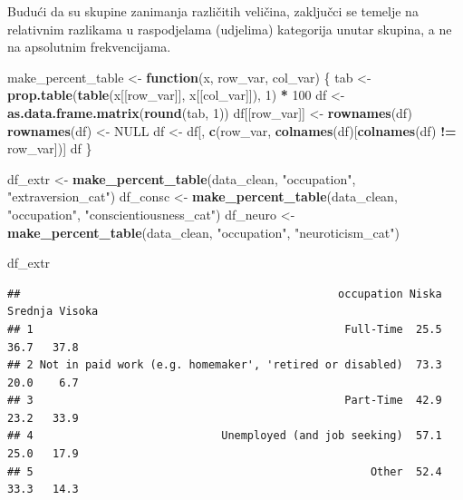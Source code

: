 \documentclass[
]{article}
\newenvironment{Shaded}{\begin{snugshade}}{\end{snugshade}}
\newcommand{\ConstantTok}[1]{\textcolor[rgb]{0.56,0.35,0.01}{#1}}
\newcommand{\ControlFlowTok}[1]{\textcolor[rgb]{0.13,0.29,0.53}{\textbf{#1}}}
\newcommand{\DecValTok}[1]{\textcolor[rgb]{0.00,0.00,0.81}{#1}}
\newcommand{\FunctionTok}[1]{\textcolor[rgb]{0.13,0.29,0.53}{\textbf{#1}}}
\newcommand{\NormalTok}[1]{#1}
\newcommand{\OtherTok}[1]{\textcolor[rgb]{0.56,0.35,0.01}{#1}}
\newcommand{\SpecialCharTok}[1]{\textcolor[rgb]{0.81,0.36,0.00}{\textbf{#1}}}
\newcommand{\StringTok}[1]{\textcolor[rgb]{0.31,0.60,0.02}{#1}}
\begin{document}
Budući da su skupine zanimanja različitih veličina, zaključci se temelje
na relativnim razlikama u raspodjelama (udjelima) kategorija unutar
skupina, a ne na apsolutnim frekvencijama.

\begin{Shaded}
\begin{Highlighting}[]
\NormalTok{make\_percent\_table }\OtherTok{\textless{}{-}} \ControlFlowTok{function}\NormalTok{(x, row\_var, col\_var) \{}
\NormalTok{  tab }\OtherTok{\textless{}{-}} \FunctionTok{prop.table}\NormalTok{(}\FunctionTok{table}\NormalTok{(x[[row\_var]], x[[col\_var]]), }\DecValTok{1}\NormalTok{) }\SpecialCharTok{*} \DecValTok{100}
\NormalTok{  df }\OtherTok{\textless{}{-}} \FunctionTok{as.data.frame.matrix}\NormalTok{(}\FunctionTok{round}\NormalTok{(tab, }\DecValTok{1}\NormalTok{))}
\NormalTok{  df[[row\_var]] }\OtherTok{\textless{}{-}} \FunctionTok{rownames}\NormalTok{(df)}
  \FunctionTok{rownames}\NormalTok{(df) }\OtherTok{\textless{}{-}} \ConstantTok{NULL}
\NormalTok{  df }\OtherTok{\textless{}{-}}\NormalTok{ df[, }\FunctionTok{c}\NormalTok{(row\_var, }\FunctionTok{colnames}\NormalTok{(df)[}\FunctionTok{colnames}\NormalTok{(df) }\SpecialCharTok{!=}\NormalTok{ row\_var])]}
\NormalTok{  df}
\NormalTok{\}}

\NormalTok{df\_extr  }\OtherTok{\textless{}{-}} \FunctionTok{make\_percent\_table}\NormalTok{(data\_clean, }\StringTok{"occupation"}\NormalTok{, }\StringTok{"extraversion\_cat"}\NormalTok{)}
\NormalTok{df\_consc }\OtherTok{\textless{}{-}} \FunctionTok{make\_percent\_table}\NormalTok{(data\_clean, }\StringTok{"occupation"}\NormalTok{, }\StringTok{"conscientiousness\_cat"}\NormalTok{)}
\NormalTok{df\_neuro }\OtherTok{\textless{}{-}} \FunctionTok{make\_percent\_table}\NormalTok{(data\_clean, }\StringTok{"occupation"}\NormalTok{, }\StringTok{"neuroticism\_cat"}\NormalTok{)}

\NormalTok{df\_extr}
\end{Highlighting}
\end{Shaded}

\begin{verbatim}
##                                                 occupation Niska Srednja Visoka
## 1                                                Full-Time  25.5    36.7   37.8
## 2 Not in paid work (e.g. homemaker', 'retired or disabled)  73.3    20.0    6.7
## 3                                                Part-Time  42.9    23.2   33.9
## 4                             Unemployed (and job seeking)  57.1    25.0   17.9
## 5                                                    Other  52.4    33.3   14.3
\end{verbatim}
\end{document}
